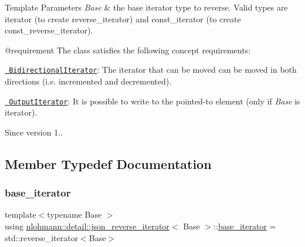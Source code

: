 \begin{DoxyTemplParams}{Template Parameters}
{\em Base} & the base iterator type to reverse. Valid types are iterator (to create reverse\+\_\+iterator) and const\+\_\+iterator (to create const\+\_\+reverse\+\_\+iterator).\\
\hline
\end{DoxyTemplParams}
@requirement The class satisfies the following concept requirements\+:
\begin{DoxyItemize}
\item \href{https://en.cppreference.com/w/cpp/named_req/BidirectionalIterator}{\texttt{ Bidirectional\+Iterator}}\+: The iterator that can be moved can be moved in both directions (i.\+e. incremented and decremented).
\item \href{https://en.cppreference.com/w/cpp/named_req/OutputIterator}{\texttt{ Output\+Iterator}}\+: It is possible to write to the pointed-\/to element (only if {\itshape Base} is iterator).
\end{DoxyItemize}

\begin{DoxySince}{Since}
version 1.. 
\end{DoxySince}


\subsection{Member Typedef Documentation}
\mbox{\label{classnlohmann_1_1detail_1_1json__reverse__iterator_a6b2ef1d632fe49bfcc22fbd1abd62395}} 
\subsubsection{\texorpdfstring{base\_iterator}{base\_iterator}}
{\footnotesize\ttfamily template$<$typename Base $>$ \\
using \mbox{\hyperlink{classnlohmann_1_1detail_1_1json__reverse__iterator}{nlohmann\+::detail\+::json\+\_\+reverse\+\_\+iterator}}$<$ Base $>$\+::\mbox{\hyperlink{classnlohmann_1_1detail_1_1json__reverse__iterator_a6b2ef1d632fe49bfcc22fbd1abd62395}{base\+\_\+iterator}} =  std\+::reverse\+\_\+iterator$<$Base$>$}



